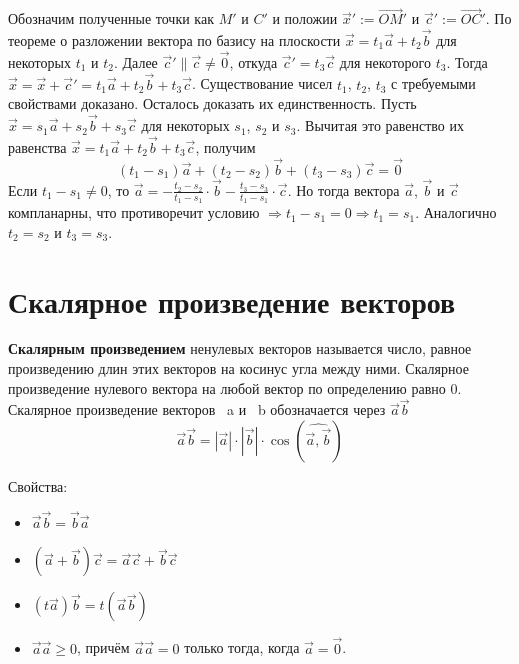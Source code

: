 \documentclass[a4paper]{article}
\begin{document}
{\begin{small}
Обозначим полученные точки как $M'$ и $C'$ и положии $\vec{x}' := \overrightarrow{OM}'$ и $\vec{c}' := \overrightarrow{OC}'$. По теореме о разложении вектора по базису на плоскости  $\vec{x} = t_1 \vec{a} + t_2 \vec{b}$ для некоторых $t_1$ и $t_2$. Далее $\vec{c}' \parallel \vec{c} \neq \vec{0}$, откуда $\vec{c}' = t_3 \vec{c}$ для некоторого $t_3$. Тогда $\vec{x} = \vec{x} + \vec{c}' = t_1 \vec{a} + t_2 \vec{b} + t_3 \vec{c}$. Существование чисел $t_1$, $t_2$, $t_3$ с требуемыми свойствами доказано.
Осталось доказать их единственность. Пусть $\vec{x} = s_1 \vec{a} + s_2 \vec{b} + s_3 \vec{c}$ для некоторых $s_1$, $s_2$ и $s_3$. Вычитая это равенство их равенства $\vec{x} = t_1 \vec{a} + t_2 \vec{b} + t_3 \vec{c}$, получим  
\begin{equation}
(t_1 -s_1) \vec{a} + (t_2 - s_2)\vec{b} + (t_3 - s_3) \vec{c} = \vec{0}
\end{equation}
Если $\displaystyle t_1 -s_1 \neq	0$, то $\vec{a} = - \frac{t_2 - s_2}{t_1 - s_1} \cdot \vec{b} - \frac{t_3 - s_3}{t_1 - s_1} \cdot \vec{c}$. Но тогда вектора $\vec{a}$, $\vec{b}$ и $\vec{c}$ компланарны, что противоречит условию $\Rightarrow t_1 - s_1 = 0 \Rightarrow t_1 = s_1$. Аналогично $t_2 = s_2$ и $t_3 = s_3$.


\section*{Скалярное произведение векторов}

\textbf{Скалярным произведением} ненулевых векторов называется число, равное
произведению длин этих векторов на косинус угла между ними. Скалярное
произведение нулевого вектора на любой вектор по определению равно 0.
Скалярное произведение векторов ~a и ~b обозначается через $\vec{a} \vec{b}$
\begin{equation}
\vec{a} \vec{b} = |\vec{a}| \cdot | \vec{b} | \cdot \cos(\widehat{\vec{a}, \vec{b}})
\end{equation}

Свойства:
\begin{itemize}
\item $\vec{a} \vec{b} = \vec{b} \vec{a}$
\item $(\vec{a} + \vec{b}) \vec{c} = \vec{a} \vec{c} + \vec{b} \vec{c}$
\item $(t \vec{a}) \vec{b} = t (\vec{a} \vec{b})$
\item $\vec{a} \vec{a} \geq 0$, причём $\vec{a} \vec{a} = 0$ только тогда, когда $\vec{a} = \vec{0}$.
\end{itemize}


\end{small}}
\end{document}
